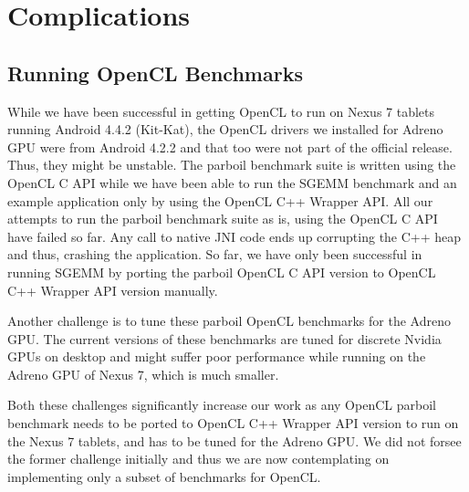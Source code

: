 \section*{Complications}
\subsection*{Running OpenCL Benchmarks}
While we have been successful in getting OpenCL to run on Nexus 7 tablets
running Android 4.4.2 (Kit-Kat), the OpenCL drivers we installed for Adreno
GPU were from
Android 4.2.2 and that too were not part of the official release. Thus, they might
be unstable. The parboil benchmark suite is written using the OpenCL C API while
we have been able to run the SGEMM benchmark and an example application only by using
the OpenCL C++ Wrapper API. All our attempts to run the parboil benchmark suite as
is, using the OpenCL C API have failed so far. Any call to native JNI code
ends up corrupting the C++ heap and thus, crashing the application. So far, we
have only been successful in running SGEMM by porting the parboil OpenCL C
API version to OpenCL C++ Wrapper API version manually.

Another challenge is to tune these parboil OpenCL benchmarks for the Adreno GPU.
The current versions of these benchmarks are tuned for discrete Nvidia GPUs on desktop and might
suffer poor performance while running on the Adreno GPU of Nexus 7, which is much
smaller.

Both these challenges significantly
increase our work as any OpenCL parboil benchmark needs to be ported to OpenCL
C++ Wrapper API version to run on the Nexus 7 tablets, and has to be tuned for
the Adreno GPU. We did not forsee the former
challenge initially and thus we are now contemplating on implementing only a
subset of benchmarks for OpenCL.
